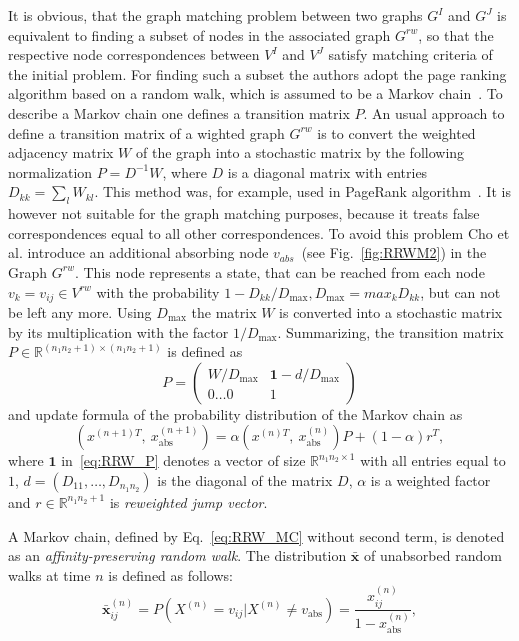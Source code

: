 It is obvious, that the graph matching problem between two graphs $G^I$ and $G^J$ is equivalent to finding a subset of nodes in the associated graph $G^{rw}$, so that the respective node correspondences between $V^I$ and $V^J$ satisfy matching criteria of the initial problem.
For finding such a subset the authors adopt the page ranking algorithm based on a random walk, which is assumed to be a Markov chain~\cite{PageRank}. To describe a Markov chain one defines a transition matrix $P$. An usual approach to define a transition matrix of a wighted graph $G^{rw}$ is to convert the weighted adjacency matrix $W$ of the graph into a stochastic matrix by the following normalization $P=D^{-1}W$, where $D$ is a diagonal matrix with entries $D_{kk}=\sum_{l}{W_{kl}}$. This method was, for example, used in PageRank algorithm~\cite{PageRank}. It is however not suitable for the graph matching purposes, because it treats false correspondences equal to all other correspondences. To avoid this problem Cho et al. introduce an additional absorbing node $v_{abs}$~(see Fig.~\ref{fig:RRWM2}) in the Graph $G^{rw}$. This node represents a state, that can be reached from each node $v_k=v_{ij}\in V^{rw}$ with the probability $1-D_{kk}/D_{\text{max}}, D_{\text{max}}=max_{k}D_{kk}$, but can not be left any more. Using $D_\text{max}$ the matrix $W$ is converted into a stochastic matrix by its multiplication with the factor $1/D_{\text{max}}$.
Summarizing, the transition matrix $P\in\mathbb{R}^{(n_1n_2+1)\times(n_1n_2+1)}$ is defined as 
\begin{equation}P=
\begin{pmatrix}
	W/D_{\text{max}} & \mathbf{1}-d/D_{\text{max}} \\
	0\dots 0 & 1
\end{pmatrix} \label{eq:RRW_P}
\end{equation}
and update formula of the probability distribution of the Markov chain as
\begin{equation}\label{eq:RRW_MC}
\left(x^{(n+1)T},\ x_{\text{abs}}^{(n+1)}\right)=\alpha\left(x^{(n)T},\ x_{\text{abs}}^{(n)}\right)P+(1-\alpha)r^T,
\end{equation}
where $\mathbf{1}$ in~\eqref{eq:RRW_P} denotes a vector of size $\mathbb{R}^{n_1n_2\times 1}$ with all entries equal to $1$, $d=(D_{11},\dots,D_{n_1n_2})$ is the diagonal of the matrix $D$, $\alpha$ is a weighted factor and $r\in\mathbb{R}^{n_1n_2+1}$ is \emph{reweighted jump vector}.

A Markov chain, defined by Eq.~\ref{eq:RRW_MC} without second term, is denoted as an \emph{affinity-preserving random walk}. The distribution $\mathbf{\bar{x}}$ of unabsorbed random walks at time $n$ is defined as follows:
\begin{equation}\label{eq:RRWM_x}
\mathbf{\bar{x}}^{(n)}_{ij}=P(X^{(n)}=v_{ij}|X^{(n)}\not=v_{\text{abs}})=\frac{x^{(n)}_{ij}}{1-x^{(n)}_{\text{abs}}}, 
\end{equation}

